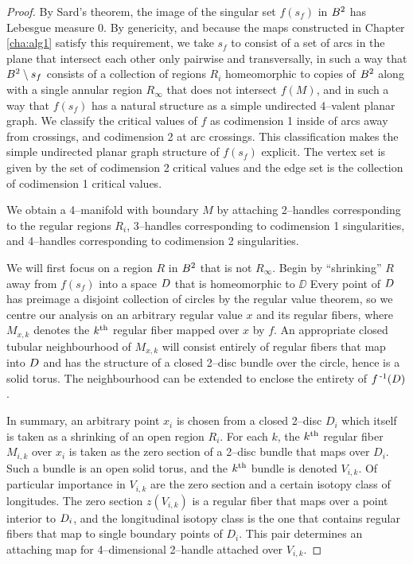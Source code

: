 \begin{proof}
	By Sard's theorem, the image of the singular set $f(s_f)$ in $B^2$ has Lebesgue measure 0.
	By genericity, and because the maps constructed in Chapter \ref{cha:alg1} satisfy this requirement, we take $s_f$ to consist of a set of arcs in the plane that intersect each other only pairwise and transversally, in such a way that $B^2\setminus s_f$ consists of a collection of regions $R_i$ homeomorphic to copies of $B^2$ along with a single annular region $R_\infty$ that does not intersect $f(M)$, and in such a way that $f(s_f)$ has a natural structure as a simple undirected 4--valent planar graph.
	We classify the critical values of $f$ as codimension 1 inside of arcs away from crossings, and codimension 2 at arc crossings.
	This classification makes the simple undirected planar graph structure of $f(s_f)$ explicit.
	The vertex set is given by the set of codimension 2 critical values and the edge set is the collection of codimension 1 critical values.
	
	We obtain a 4--manifold with boundary $M$ by attaching 2--handles corresponding to the regular regions $R_i$, 3--handles corresponding to codimension 1 singularities, and 4--handles corresponding to codimension 2 singularities.
	
	We will first focus on a region $R$ in $B^2$ that is not $R_\infty$.
	Begin by ``shrinking'' $R$ away from $f(s_f)$ into a space $D$ that is homeomorphic to $\DD$
	Every point of $D$ has preimage a disjoint collection of circles by the regular value theorem, so we centre our analysis on an arbitrary regular value $x$ and its regular fibers, where $M_{x,k}$ denotes the $k^{\text{th}}$ regular fiber mapped over $x$ by $f$.
	An appropriate closed tubular neighbourhood of $M_{x,k}$ will consist entirely of regular fibers that map into $D$ and has the structure of a closed 2--disc bundle over the circle, hence is a solid torus.
	The neighbourhood can be extended to enclose the entirety of $f^{\,\text{-}1}(D)$.
	
	In summary, an arbitrary point $x_i$ is chosen from a closed 2--disc $D_i$ which itself is taken as a shrinking of an open region $R_i$.
	For each $k$, the $k^{\text{th}}$ regular fiber $M_{i,k}$ over $x_i$ is taken as the zero section of a 2--disc bundle that maps over $D_i$.
	Such a bundle is an open solid torus, and the $k^{\text{th}}$ bundle is denoted $V_{i,k}$.
	Of particular importance in $V_{i,k}$ are the zero section and a certain isotopy class of longitudes.
	The zero section $z(V_{i,k})$ is a regular fiber that maps over a point interior to $D_i$, and the longitudinal isotopy class is the one that contains regular fibers that map to single boundary points of $D_i$.
	This pair determines an attaching map for 4--dimensional 2--handle attached over $V_{i,k}$.
	


\end{proof}
